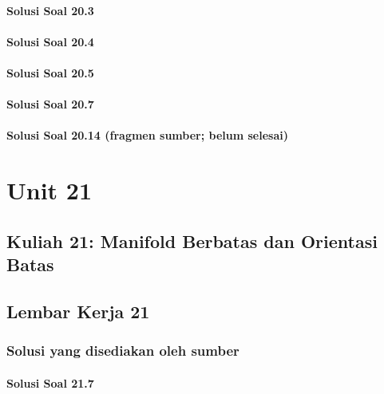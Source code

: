 \documentclass[11pt,a4paper,oneside]{book}
\begin{document}
\subsection*{Solusi Soal 20.3}

\subsection*{Solusi Soal 20.4}

\subsection*{Solusi Soal 20.5}

\subsection*{Solusi Soal 20.7}

\subsection*{Solusi Soal 20.14 (fragmen sumber; belum selesai)}


\part{Unit 21}
\chapter[Kuliah 21]{Kuliah 21: Manifold Berbatas dan Orientasi Batas}


\chapter{Lembar Kerja 21}


\section*{Solusi yang disediakan oleh sumber}
\subsection*{Solusi Soal 21.7}

\clearpage
\end{document}
